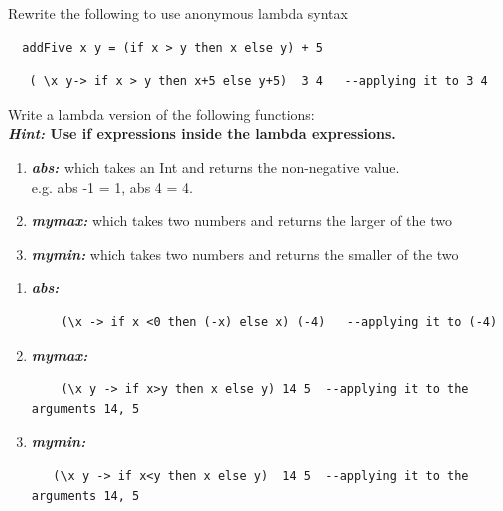 \documentclass{article}
\begin{document}
\begin{exercise}
  Rewrite the following to use anonymous lambda syntax 
  \begin{lstlisting}
  addFive x y = (if x > y then x else y) + 5
\end{lstlisting}
\end{exercise}
\begin{solution}
  \begin{lstlisting}
   ( \x y-> if x > y then x+5 else y+5)  3 4   --applying it to 3 4
  \end{lstlisting}
\end{solution}
\begin{exercise}
Write a lambda version of the following functions: \\
\textbf{\textit{Hint:} Use if expressions inside the lambda expressions.}
\begin{enumerate}
\item  \textbf{\textit{abs:}} which takes an Int and returns the non-negative value. \\
e.g. abs -1 = 1, abs 4 = 4.
\item \textbf{\textit{mymax:}} which takes two numbers and returns the larger of the two \\
\item \textbf{\textit{mymin:}} which takes two numbers and returns the smaller of the two \\
\end{enumerate}
\end{exercise}
\begin{solution}
  \begin{enumerate}
    \item \textbf{\textit{abs:}}
  \begin{lstlisting}
    (\x -> if x <0 then (-x) else x) (-4)   --applying it to (-4)
  \end{lstlisting}

  \item \textbf{\textit{mymax:}}
  \begin{lstlisting}
    (\x y -> if x>y then x else y) 14 5  --applying it to the arguments 14, 5
  \end{lstlisting}

  \item \textbf{\textit{mymin:}}
  \begin{lstlisting}
   (\x y -> if x<y then x else y)  14 5  --applying it to the arguments 14, 5
  \end{lstlisting}

\end{enumerate}
\end{solution}
\


\end{document}
